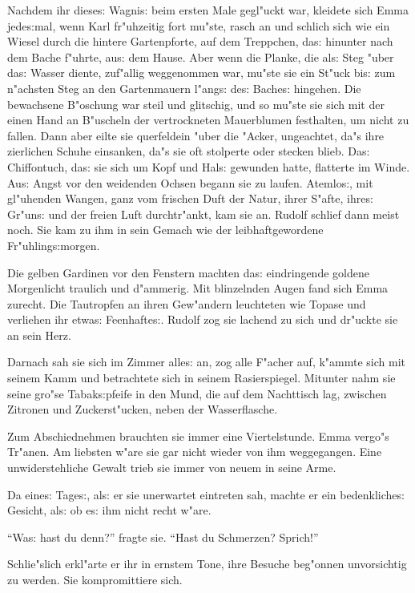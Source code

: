 \documentclass[oneside,12pt]{book}
\newcommand{\s}{s:}%
\begin{document}
Nachdem ihr diese{\s} Wagni{\s} beim ersten Male gegl"uckt war,
kleidete sich Emma jede{\s}mal, wenn Karl fr"uhzeitig fort mu"ste,
rasch an und schlich sich wie ein Wiesel durch die hintere
Gartenpforte, auf dem Treppchen, da{\s} hinunter nach dem Bache
f"uhrte, au{\s} dem Hause. Aber wenn die Planke, die al{\s} Steg
"uber da{\s} Wasser diente, zuf"allig weggenommen war, mu"ste sie
ein St"uck bi{\s} zum n"achsten Steg an den Gartenmauern l"ang{\s}
de{\s} Bache{\s} hingehen. Die bewachsene B"oschung war steil und
glitschig, und so mu"ste sie sich mit der einen Hand an B"uscheln
der vertrockneten Mauerblumen festhalten, um nicht zu fallen. Dann
aber eilte sie querfeldein "uber die "Acker, ungeachtet, da"s ihre
zierlichen Schuhe einsanken, da"s sie oft stolperte oder stecken
blieb. Da{\s} Chiffontuch, da{\s} sie sich um Kopf und Hal{\s}
gewunden hatte, flatterte im Winde. Au{\s} Angst vor den weidenden
Ochsen begann sie zu laufen. Atemlo{\s}, mit gl"uhenden Wangen,
ganz vom frischen Duft der Natur, ihrer S"afte, ihre{\s} Gr"un{\s}
und der freien Luft durchtr"ankt, kam sie an. Rudolf schlief dann
meist noch. Sie kam zu ihm in sein Gemach wie der
leibhaftgewordene Fr"uhling{\s}morgen.

Die gelben Gardinen vor den Fenstern machten da{\s} eindringende
goldene Morgenlicht traulich und d"ammerig. Mit blinzelnden Augen
fand sich Emma zurecht. Die Tautropfen an ihren Gew"andern
leuchteten wie Topase und verliehen ihr etwa{\s} Feenhafte{\s}.
Rudolf zog sie lachend zu sich und dr"uckte sie an sein Herz.

Darnach sah sie sich im Zimmer alle{\s} an, zog alle F"acher auf,
k"ammte sich mit seinem Kamm und betrachtete sich in seinem
Rasierspiegel. Mitunter nahm sie seine gro"se Tabak{\s}pfeife in
den Mund, die auf dem Nachttisch lag, zwischen Zitronen und
Zuckerst"ucken, neben der Wasserflasche.

Zum Abschiednehmen brauchten sie immer eine Viertelstunde. Emma
vergo"s Tr"anen. Am liebsten w"are sie gar nicht wieder von ihm
weggegangen. Eine unwiderstehliche Gewalt trieb sie immer von
neuem in seine Arme.

Da eine{\s} Tage{\s}, al{\s} er sie unerwartet eintreten sah,
machte er ein bedenkliche{\s} Gesicht, al{\s} ob e{\s} ihm nicht
recht w"are.

"`Wa{\s} hast du denn?"' fragte sie. "`Hast du Schmerzen?
Sprich!"'

Schlie"slich erkl"arte er ihr in ernstem Tone, ihre Besuche
beg"onnen unvorsichtig zu werden. Sie kompromittiere sich.
\end{document}
